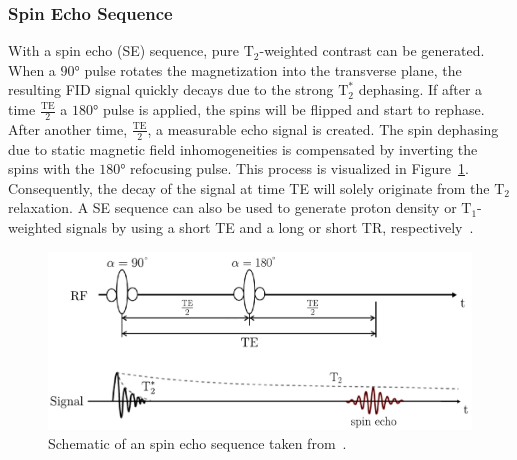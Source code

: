 \subsubsection{Spin Echo Sequence}
With a spin echo (SE) sequence, pure $\text{T}_2$-weighted contrast can be generated. When a $90°$ pulse rotates the magnetization into the transverse plane, the resulting FID signal quickly decays due to the strong $\text{T}^*_2$ dephasing. If after a time $\frac{\text{TE}}{2}$ a $180°$ pulse is applied, the spins will be flipped and start to rephase. After another time, $\frac{\text{TE}}{2}$, a measurable echo signal is created. The spin dephasing due to static magnetic field inhomogeneities is compensated by inverting the spins with the $180°$ refocusing pulse. This process is visualized in Figure~\ref{fig:SpinEcho}.\\
Consequently, the decay of the signal at time TE will solely originate from the $\text{T}_2$ relaxation. A SE sequence can also be used to generate proton density or $\text{T}_1$-weighted signals by using a short TE and a long or short TR, respectively~\cite{PulseSequences}.

\begin{figure}[htpb]
	\centering
	\includegraphics[width=\linewidth]{./Images/SpinEcho.pdf} 
	\caption{Schematic of an spin echo sequence taken from~\cite{PulseSequences}.}
	\label{fig:SpinEcho}
\end{figure}


